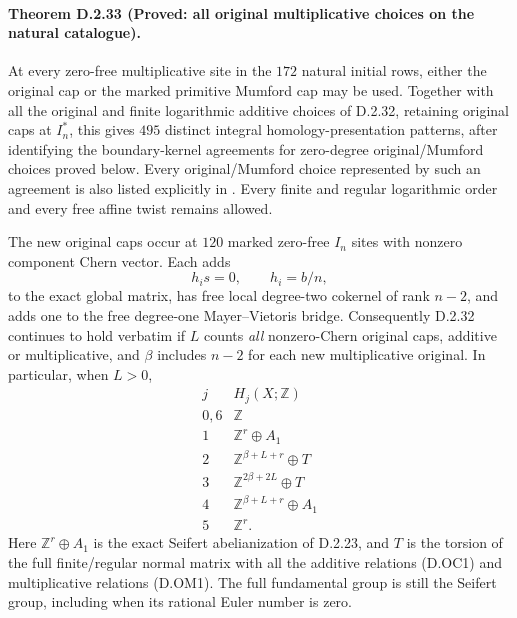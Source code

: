 \paragraph{Theorem D.2.33 (Proved: all original multiplicative choices on the natural catalogue).}
At every zero-free multiplicative site in the $172$ natural
initial rows, either the original cap or the marked primitive
Mumford cap may be used. Together with all the original and
finite logarithmic additive choices of D.2.32, retaining
original caps at $I_n^*$, this gives $495$ distinct integral homology-presentation
patterns, after identifying the boundary-kernel agreements
for zero-degree original/Mumford choices proved below.
Every original/Mumford choice represented by such an
agreement is also listed explicitly in
.
Every finite and regular logarithmic order and every free
affine twist remains allowed.

The new original caps occur at $120$ marked zero-free
$I_n$ sites with nonzero component Chern vector. Each adds
\[
 h_i s=0,\qquad h_i=b/n,                                   \tag{D.OM1}
\]
to the exact global matrix, has free local degree-two
cokernel of rank $n-2$, and adds one to the free
degree-one Mayer--Vietoris bridge. Consequently D.2.32
continues to hold verbatim if $L$ counts \emph{all}
nonzero-Chern original caps, additive or multiplicative,
and $\beta$ includes $n-2$ for each new multiplicative
original. In particular, when $L>0$,
\[
\begin{array}{c|c}
j&H_j(X;\mathbb Z)\\\hline
0,6&\mathbb Z\\
1&\mathbb Z^r\oplus A_1\\
2&\mathbb Z^{\beta+L+r}\oplus T\\
3&\mathbb Z^{2\beta+2L}\oplus T\\
4&\mathbb Z^{\beta+L+r}\oplus A_1\\
5&\mathbb Z^r.
\end{array}                                                \tag{D.OM2}
\]
Here $\mathbb Z^r\oplus A_1$ is the exact Seifert
abelianization of D.2.23, and $T$ is the torsion of the
full finite/regular normal matrix with all the additive
relations (D.OC1) and multiplicative relations (D.OM1).
The full fundamental group is still the Seifert group,
including when its rational Euler number is zero.

